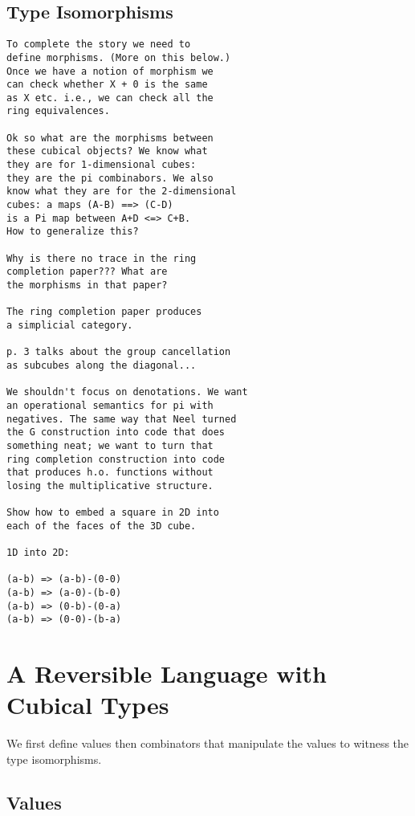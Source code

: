 \documentclass[authoryear,preprint]{sigplanconf}
\begin{document}
\subsection{Type Isomorphisms}

\begin{verbatim}
To complete the story we need to 
define morphisms. (More on this below.)
Once we have a notion of morphism we 
can check whether X + 0 is the same
as X etc. i.e., we can check all the 
ring equivalences. 

Ok so what are the morphisms between 
these cubical objects? We know what
they are for 1-dimensional cubes: 
they are the pi combinabors. We also
know what they are for the 2-dimensional 
cubes: a maps (A-B) ==> (C-D) 
is a Pi map between A+D <=> C+B. 
How to generalize this? 

Why is there no trace in the ring 
completion paper??? What are 
the morphisms in that paper?

The ring completion paper produces
a simplicial category.

p. 3 talks about the group cancellation
as subcubes along the diagonal... 

We shouldn't focus on denotations. We want
an operational semantics for pi with 
negatives. The same way that Neel turned
the G construction into code that does
something neat; we want to turn that 
ring completion construction into code
that produces h.o. functions without
losing the multiplicative structure.

Show how to embed a square in 2D into
each of the faces of the 3D cube.

1D into 2D:

(a-b) => (a-b)-(0-0)
(a-b) => (a-0)-(b-0)
(a-b) => (0-b)-(0-a)
(a-b) => (0-0)-(b-a)

\end{verbatim}

\section{A Reversible Language with Cubical Types} 

We first define values then combinators that manipulate the values to witness
the type isomorphisms.

\subsection{Values} 
\end{document}

